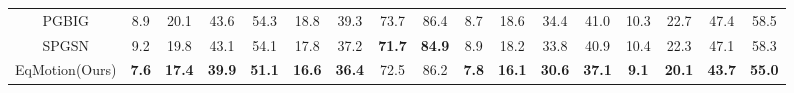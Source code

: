 \documentclass[10pt,twocolumn,letterpaper]{article}
\begin{document}
\begin{table*}[t]
{\begin{tabular}{c|cccc|cccc|cccc|cccc}
PGBIG                &   {8.9}  &   {20.1} &   {43.6} &   {54.3} &   {18.8} &   {39.3} &   {73.7} &   {86.4} &   {8.7}  &   {18.6} &   {34.4} &   {41.0} &   {10.3}  &   {22.7}  &   {47.4}  &   {58.5} \\ 
SPGSN                & 9.2& 19.8& 43.1& 54.1        &  17.8& 37.2& \textbf{71.7}& \textbf{84.9}               & 8.9 &18.2& 33.8& 40.9        & 10.4 &22.3 &47.1& 58.3         \\ 
EqMotion(Ours) &\textbf{7.6}& \textbf{17.4}& \textbf{39.9}& \textbf{51.1}& \textbf{16.6}&\textbf{36.4} &{72.5}& {86.2}&\textbf{7.8} &\textbf{16.1}& \textbf{30.6}& \textbf{37.1}& \textbf{9.1} &\textbf{20.1} &\textbf{43.7}& \textbf{55.0}\\\hline
\end{tabular}
}
\label{tab:supp_human3.6_shortterm}
\vspace{-3mm}
\end{table*}
\end{document}
